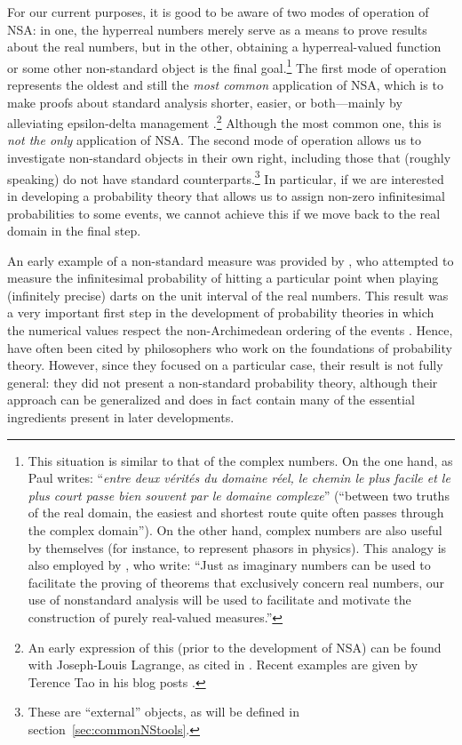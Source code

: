 For our current purposes, it is good to be aware of two modes of operation of NSA: in one, the hyperreal numbers merely serve as a means to prove results about the real numbers, but in the other, obtaining a hyperreal-valued function or some other non-standard object is the final goal.\footnote{This situation is similar to that of the complex numbers. On the one hand, as Paul \citet[pp.~1--2]{Painleve:1967} writes: ``\textit{entre deux v{\'e}rit{\'e}s du domaine r{\'e}el, le chemin le plus facile et le plus court passe bien souvent par le domaine complexe}'' (``between two truths of the real domain, the easiest and shortest route quite often passes through the complex domain''). On the other hand, complex numbers are also useful by themselves (for instance, to represent phasors in physics).
This analogy is also employed by \citet[p.~416]{BarthaHitchcock:1999}, who write: ``Just as imaginary numbers can be used to facilitate the proving of theorems that exclusively concern real numbers, our use of nonstandard analysis will be used to facilitate and motivate the construction of purely real-valued measures.''}
The first mode of operation represents the oldest and still the \emph{most common} application of NSA, which is to make proofs about standard analysis shorter, easier, or both---mainly by alleviating epsilon-delta management \citep{Tao:2007}.\footnote{An early expression of this (prior to the development of NSA) can be found with Joseph-Louis Lagrange, as cited in \citet[p.~63]{Blaszczyk_etal:2013}. Recent examples are given by Terence Tao in his blog posts \citep[see, \textit{e.g.},][]{Tao:2007-2012}.} Although the most common one, this is \emph{not the only} application of NSA.
The second mode of operation allows us to investigate non-standard objects in their own right, including those that (roughly speaking) do not have standard counterparts.\footnote{These are ``external'' objects, as will be defined in section~\ref{sec:commonNStools}.} In particular, if we are interested in developing a probability theory that allows us to assign non-zero infinitesimal probabilities to some events, we cannot achieve this if we move back to the real domain in the final step.

An early example of a non-standard measure was provided by \citet{BernsteinWattenberg:1969}, who attempted to measure the infinitesimal probability of hitting a particular point when playing (infinitely precise) darts on the unit interval of the real numbers. This result was a very important first step in the development of probability theories in which the numerical values respect the non-Archimedean ordering of the events \citep[as studied by~][]{deFinetti:1936}. Hence, \citet{BernsteinWattenberg:1969} have often been cited by philosophers who work on the foundations of probability theory. However, since they focused on a particular case, their result is not fully general: they did not present a non-standard probability theory, although their approach can be generalized and does in fact contain many of the essential ingredients present in later developments.


